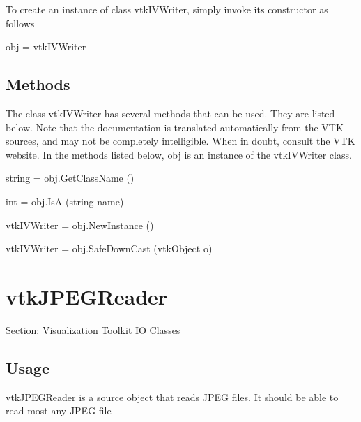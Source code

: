 To create an instance of class vtk\-I\-V\-Writer, simply invoke its constructor as follows \begin{DoxyVerb}  obj = vtkIVWriter
\end{DoxyVerb}
 \hypertarget{vtkwidgets_vtkxyplotwidget_Methods}{}\subsection{Methods}\label{vtkwidgets_vtkxyplotwidget_Methods}
The class vtk\-I\-V\-Writer has several methods that can be used. They are listed below. Note that the documentation is translated automatically from the V\-T\-K sources, and may not be completely intelligible. When in doubt, consult the V\-T\-K website. In the methods listed below, {\ttfamily obj} is an instance of the vtk\-I\-V\-Writer class. 
\begin{DoxyItemize}
\item {\ttfamily string = obj.\-Get\-Class\-Name ()}  
\item {\ttfamily int = obj.\-Is\-A (string name)}  
\item {\ttfamily vtk\-I\-V\-Writer = obj.\-New\-Instance ()}  
\item {\ttfamily vtk\-I\-V\-Writer = obj.\-Safe\-Down\-Cast (vtk\-Object o)}  
\end{DoxyItemize}\hypertarget{vtkio_vtkjpegreader}{}\section{vtk\-J\-P\-E\-G\-Reader}\label{vtkio_vtkjpegreader}
Section\-: \hyperlink{sec_vtkio}{Visualization Toolkit I\-O Classes} \hypertarget{vtkwidgets_vtkxyplotwidget_Usage}{}\subsection{Usage}\label{vtkwidgets_vtkxyplotwidget_Usage}
vtk\-J\-P\-E\-G\-Reader is a source object that reads J\-P\-E\-G files. It should be able to read most any J\-P\-E\-G file

